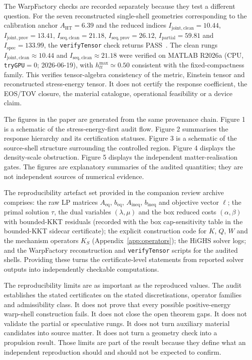 \documentclass[11pt,a4paper]{article}
\begin{document}
The WarpFactory checks are recorded separately because they test a different question. For the seven reconstructed single-shell geometries corresponding to the calibration anchor $A_{\mathrm{HT}}=6.39$ and the reduced indices $I_{\mathrm{joint,clean}}=10.44$, $I_{\mathrm{joint,prov}}=13.41$, $I_{\mathrm{seq,clean}}=21.18$, $I_{\mathrm{seq,prov}}=26.12$, $I_{\mathrm{partial}}=59.81$ and $I_{\mathrm{spec}}=133.99$, the \texttt{verifyTensor} check returns PASS~\cite{WarpFactoryCQG2024}. The clean rungs $I_{\mathrm{joint,clean}}\approx10.44$ and $I_{\mathrm{seq,clean}}\approx21.18$ were verified on MATLAB R2026a (CPU, \texttt{tryGPU}$=0$; 2026-06-19), with $h_{tt}^{\max}\simeq0.50$ consistent with the fixed-compactness family. This verifies tensor-algebra consistency of the metric, Einstein tensor and reconstructed stress-energy tensor. It does not certify the response coefficient, the EOS/TOV closure, the material catalogue, operational feasibility or a device claim.

The figures in the paper are generated from the same provenance chain. Figure 1 is a schematic of the stress-energy-first audit flow. Figure 2 summarises the response hierarchy and its certification statuses. Figure 3 is a schematic of the source-shell structure surrounding the controlled region. Figure 4 displays the density-scale obstruction. Figure 5 displays the independent matter-realisation gates. The figures are explanatory summaries of the audited quantities; they are not independent sources of numerical evidence.

The reproducibility artefact set provided in the companion review archive comprises: the raw LP matrices $A_{\mathrm{eq}}$, $b_{\mathrm{eq}}$, $A_{\mathrm{ineq}}$, $b_{\mathrm{ineq}}$ and objective vector $\ell$; the primal solution $\tau$, the dual variables $(\lambda,\mu)$ and the box reduced costs $(\alpha,\beta)$ with bounded-KKT residuals (recorded with the box cap-sensitivity table in the bounded-KKT sidecar certificate); the explicit construction code for $K$, $Q$, $W$ and the mechanism operators $K_S$ (Appendix~\ref{app:operators}); the HiGHS solver logs; and the WarpFactory reconstruction and \texttt{verifyTensor} scripts for the audited shells. Providing these turns the certificate-level statements from reported solver outputs into independently checkable computations.

The reproducibility limits are as important as the reproduced values. The audit establishes the stated certificates on the stated discretisations, operator families and admissibility class. It does not prove that every possible positive-energy warp-shell construction fails. It does not close the open theorem gaps. It does not validate the partial or speculative rungs. It does not turn auxiliary material candidates into source matter. It does not turn a geometry check into a propulsion result. Those limits are part of the result because they define what an independent reproduction should and should not be expected to confirm.
\end{document}
